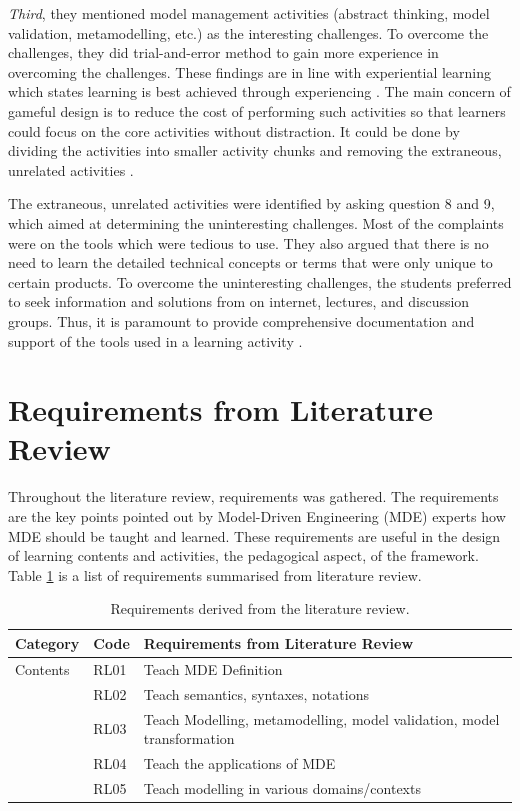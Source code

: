 \documentclass[12pt, a4paper]{report} \usepackage[titletoc]{appendix}
\begin{document}
\begin{appendices}
\textit{Third}, they mentioned model management activities (abstract thinking, model validation, metamodelling, etc.) as the interesting challenges. To overcome the challenges, they did trial-and-error method to gain more experience in overcoming the challenges. These findings are in line with experiential learning which states learning is best achieved through experiencing \cite{kolb2014experiential}. The main concern of gameful design is to reduce the cost of performing such activities so that learners could focus on the core activities without distraction. It could be done by dividing the activities into smaller activity chunks and removing the extraneous, unrelated activities \cite{deterding2015lens}. 

The extraneous, unrelated activities were identified by asking question 8 and 9, which aimed at determining the uninteresting challenges. Most of the complaints were on the tools which were tedious to use. They also argued that there is no need to learn the detailed technical concepts or terms that were only unique to certain products. To overcome the uninteresting challenges, the students preferred to seek information and solutions from on internet, lectures, and discussion groups. Thus, it is paramount to provide comprehensive documentation and support of the tools used in a learning activity \cite{liebel2015ready}. 

\section{Requirements from Literature Review}
\label{Requirements from Literature Review}
Throughout the literature review, requirements was gathered. The requirements are the key points pointed out by Model-Driven Engineering (MDE) experts how MDE should be taught and learned. These requirements are useful in the design of learning contents and activities, the pedagogical aspect, of the framework. Table \ref{table:requirements} is a list of requirements summarised from literature review. 

\begin{table}[ht]\caption{Requirements derived from the literature review.}
\label{table:requirements}
\begin{center}
\begin{tabular}{ p{2cm}p{1cm}p{10cm} } 
\hline
Category & Code & Requirements from Literature Review \\
\hline
\multirow{1}{2cm}{Contents} 
& RL01 & Teach MDE Definition \\ 
& RL02 & Teach semantics, syntaxes, notations \\ 
& RL03 & Teach Modelling, metamodelling, model validation, model transformation\\
& RL04 & Teach the applications of MDE \\
& RL05 & Teach modelling in various domains/contexts \\


\end{tabular}
\end{center}
\end{table}
\end{appendices}
\end{document}
